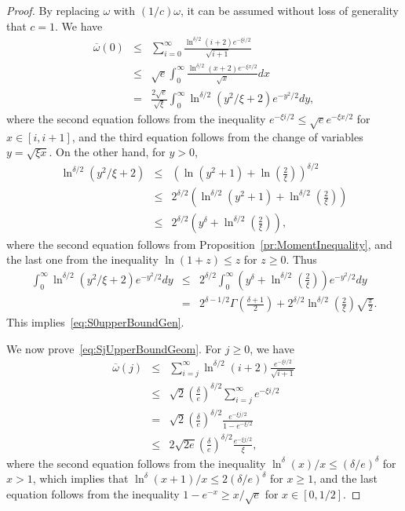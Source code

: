 \documentclass[10pt,a4paper]{amsart}
\begin{document}
\begin{proof} By replacing \(\omega\) with \((1/c)\omega\), it can be assumed without loss of generality that \(c=1\). We have
\begin{eqnarray*}
\overline{\omega}(0)&\leq&
\sum^{\infty}_{i=0}\frac{\ln^{\delta/2}(i+2)e^{-\xi i/2}}{\sqrt{i+1}}
 \\&\le&\sqrt{e}\int^{\infty}_{0}\frac{\ln^{\delta/2}(x+2)e^{-\xi x/2}}{\sqrt{x}}dx
 \\&=& \frac{2\sqrt{e}}{\sqrt{\xi}}\int^{\infty}_{0}\ln^{\delta/2}(y^{2}/\xi+2)e^{-y^{2}/2}dy, \end{eqnarray*}
where the second equation follows from the inequality \(e^{-\xi i/2}\leq \sqrt{e}e^{-\xi x/2}\) for \(x\in[i,i+1]\), and the third equation follows from the change of variables \(y=\sqrt{\xi x}\).
On the other hand, for \(y>0\), \begin{eqnarray*}\ln^{\delta/2}(y^{2}/\xi+2)
&\le&(\ln(y^{2}+1)+\ln(\frac{2}{\xi}))^{\delta/2}\\&\le&2^{\delta/2}(\ln^{\delta/2}(y^{2}+1)+\ln^{\delta/2}(\frac{2}{\xi}))\\
&\le&2^{\delta/2}(y^{\delta}+\ln^{\delta/2}(\frac{2}{\xi})),
\end{eqnarray*}where the second equation follows from Proposition~\ref{pr:MomentInequality}, and the last one from the inequality \(\ln(1+z)\leq z\) for \(z\geq0\). Thus \begin{eqnarray*}
\int^{\infty}_{0}\ln^{\delta/2}(y^{2}/\xi+2)e^{-y^{2}/2}dy&\le&2^{\delta/2}\int^{\infty}_{0}(y^{\delta}+\ln^{\delta/2}(\frac{2}{\xi}))e^{-y^{2}/2}dy\\&=&2^{\delta-1/2}\Gamma(\frac{\delta+1}{2})+2^{\delta/2}\ln^{\delta/2}(\frac{2}{\xi})\sqrt{\frac{\pi}{2}}.
\end{eqnarray*}This implies~\eqref{eq:S0upperBoundGen}. 

We now prove~\eqref{eq:SjUpperBoundGeom}. 
For \(j\geq 0\), we have
 \begin{eqnarray*}
 \overline{\omega}(j)&\le&
 \sum^{\infty}_{i=j}\ln^{\delta/2}(i+2)\frac{e^{-\xi i/2}}{\sqrt{i+1}}
 \\&\le&\sqrt{2}{\left(\frac{\delta}{e}\right)}^{\delta/2}\sum^{\infty}_{i=j}e^{-\xi i/2}
 \\&=&\sqrt{2}{\left(\frac{\delta}{e}\right)}^{\delta/2}\frac{e^{-\xi j/2}}{1-e^{-\xi/2}}
 \\&\le&2\sqrt{2e}{\left(\frac{\delta}{e}\right)}^{\delta/2}\frac{e^{-\xi j/2}}{\xi}, \end{eqnarray*}
 where the second equation follows from the inequality \(\ln^{\delta}(x)/x\leq(\delta/e)^{\delta}\) for \(x>1\), which implies that  \(\ln^{\delta}(x+1)/x\leq2(\delta/e)^{\delta}\) for \(x\geq1\),  and the last equation follows from the inequality \(1-e^{-x}\geq x/\sqrt{e}\) for \(x\in[0,1/2]\).
 \end{proof}
\end{document}
